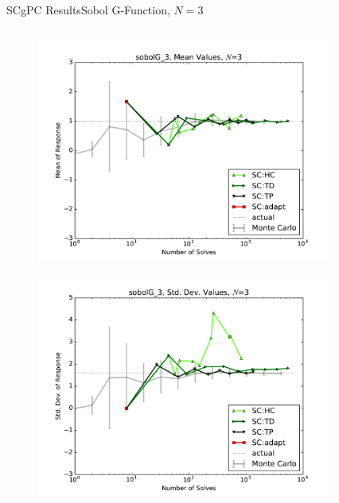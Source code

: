 \documentclass{beamer}
\begin{document}
\begin{frame}{SCgPC Results}{Sobol G-Function, $N=3$}\vspace{-20pt}
 \begin{columns}
   \begin{column}{0.5\textwidth}
        \begin{figure}[h!]
          \centering
          \includegraphics[width=0.8\linewidth]{anlmodels/sobolG_3_mean_vals_nohdmr}
        \end{figure}
        \vspace{-20pt}
        \begin{figure}[h!]
          \centering
          \includegraphics[width=0.8\linewidth]{anlmodels/sobolG_3_var_vals_nohdmr}
        \end{figure}
   \end{column}
   \begin{column}{0.5\textwidth}
        \begin{figure}[h!]
          \centering

\end{figure}
\end{column}
\end{columns}
\end{frame}
\end{document}
